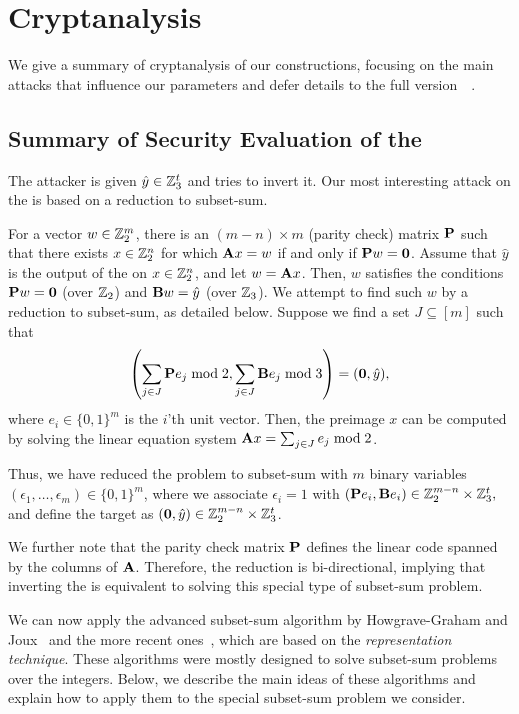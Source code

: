 \section{Cryptanalysis}
\label{sec:cryptanalysis}

\newcommand{\zerovec}{\textbf{0}}

We give a summary of cryptanalysis of our constructions, focusing on the main attacks that influence our parameters and defer details to the full version~~\cite{fullversion}.

\subsection{Summary of Security Evaluation of the \ttOWF}

The attacker is given $\hat{y} \in \mathbb{Z}_3^t$ and tries to invert it. Our most interesting attack on the \ttOWF is based on a reduction to subset-sum.

For a vector $w \in \mathbb{Z}_2^m$, there is an $(m -n) \times m$ (parity check) matrix $\mat{P}$ such that there exists $x \in \mathbb{Z}_2^n$ for which $\mat{A}x = w$ if and only if $\mat{P} w=\zerovec$. Assume that $\hat{y}$ is the output of the \ttOWF on $x \in \mathbb{Z}_2^n$, and let $w = \mat{A}x$. Then, $w$ satisfies the conditions $\mat{P} w = \zerovec$ (over $\mathbb{Z}_2$) and $\mat{B}w = \hat{y}$ (over $\mathbb{Z}_3$). We attempt to find such $w$ by a reduction to subset-sum, as detailed below. Suppose we find a set $J \subseteq [m]$ such that
$$\left( \sum_{j \in J} \mat{P}e_j  \bmod 2, \sum_{j \in J} \mat{B}e_j  \bmod 3 \right) = (\zerovec,\hat{y}),$$
where $e_i \in \{0,1\}^m$ is the $i$'th unit vector. Then, the preimage $x$ can be computed by solving the linear equation system $\mat{A}x = \sum_{j \in J} e_j  \bmod 2$.

Thus, we have reduced the problem to subset-sum with $m$ binary variables
$(\epsilon_1, \ldots, \epsilon_m) \in \{0,1\}^m$, where we associate $\epsilon_i = 1$
with $(\mat{P}e_i, \mat{B}e_i) \in \Z_2^{m-n} \times \Z_3^t,$ and define the target as $(\zerovec,\hat{y}) \in \Z_2^{m-n} \times \Z_3^t$.

We further note that the parity check matrix $\mat{P}$ defines the linear code spanned by the columns of $\mat{A}$. Therefore, the reduction is bi-directional, implying that inverting the \ttOWF is equivalent to solving this special type of subset-sum problem.


We can now apply the advanced subset-sum algorithm by Howgrave{-}Graham and Joux~\cite{Howgrave-GrahamJ10} and the more recent ones~\cite{BeckerCJ11,BonnetainBSS20}, which are based on the \emph{representation technique}. These algorithms were mostly designed to solve subset-sum problems over the integers. Below, we describe the main ideas of these algorithms and explain how to apply them to the special subset-sum problem we consider.

